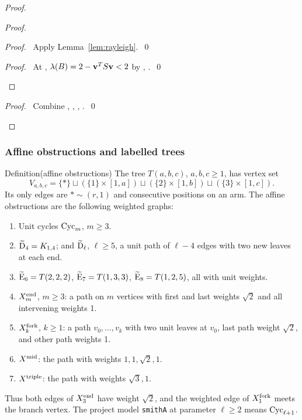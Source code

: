 \begin{proof}
\begin{proof}
\begin{proof}\pf\ Apply Lemma~\ref{lem:rayleigh}.~\qed\end{proof}
\qedstep
\begin{proof}\pf\ At ,
$\lambda(B)=2-{\mathbf v}^TS{\mathbf v}<2$ by , .~\qed\end{proof}
\end{proof}
\qedstep
\begin{proof}\pf\ Combine , ,
, .~\qed\end{proof}
\end{proof}

\subsubsection{Affine obstructions and labelled trees}

\begin{namedresult}{Definition}{(affine obstructions)}\label{def:affine}
The tree $T(a,b,c)$, $a,b,c\geq1$, has vertex set
\[
 V_{a,b,c}=\{*\}\sqcup(\{1\}\times[1,a])\sqcup
 (\{2\}\times[1,b])\sqcup(\{3\}\times[1,c]).
\]
Its only edges are $*\sim(r,1)$ and consecutive positions on an arm.
The affine obstructions are the following weighted graphs:
\begin{enumerate}
\item Unit cycles $\operatorname{Cyc}_m$, $m\geq3$.
\item $\widetilde{\mathrm{D}}_4=K_{1,4}$; and $\widetilde{\mathrm{D}}_\ell$,
$\ell\geq5$, a unit path of $\ell-4$ edges with two new leaves at each end.
\item $\widetilde{\mathrm{E}}_6=T(2,2,2)$,
$\widetilde{\mathrm{E}}_7=T(1,3,3)$, $\widetilde{\mathrm{E}}_8=T(1,2,5)$,
all with unit weights.
\item $X^{\rm end}_m$, $m\geq3$: a path on $m$ vertices with first and
last weights $\sqrt2$ and all intervening weights 1.
\item $X^{\rm fork}_k$, $k\geq1$: a path $v_0,\ldots,v_k$ with two
unit leaves at $v_0$, last path weight $\sqrt2$, and other path weights 1.
\item $X^{\rm mid}$: the path with weights $1,1,\sqrt2,1$.
\item $X^{\rm triple}$: the path with weights $\sqrt3,1$.
\end{enumerate}
Thus both edges of $X^{\rm end}_3$ have weight $\sqrt2$, and the weighted
edge of $X^{\rm fork}_1$ meets the branch vertex. The project model
\texttt{smithA} at parameter $\ell\geq2$ means $\operatorname{Cyc}_{\ell+1}$.
\end{namedresult}

